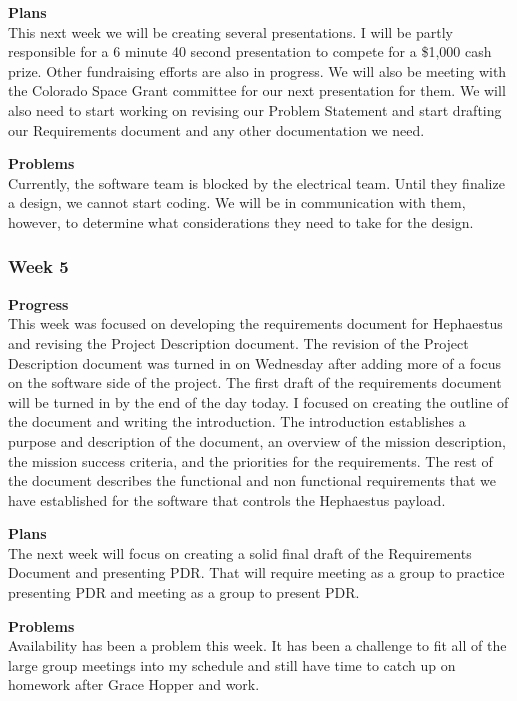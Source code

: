 \textbf{Plans} \\
This next week we will be creating several presentations. I will be partly responsible for a 6 minute 40 second presentation to compete for a \$1,000 cash prize. Other fundraising efforts are also in progress. We will also be meeting with the Colorado Space Grant committee for our next presentation for them. We will also need to start working on revising our Problem Statement and start drafting our Requirements document and any other documentation we need.

\textbf{Problems} \\
Currently, the software team is blocked by the electrical team. Until they finalize a design, we cannot start coding. We will be in communication with them, however, to determine what considerations they need to take for the design.

\subsubsection{Week 5}
\textbf{Progress} \\
This week was focused on developing the requirements document for Hephaestus and revising the Project Description document. The revision of the Project Description document was turned in on Wednesday after adding more of a focus on the software side of the project. The first draft of the requirements document will be turned in by the end of the day today. I focused on creating the outline of the document and writing the introduction. The introduction establishes a purpose and description of the document, an overview of the mission description, the mission success criteria, and the priorities for the requirements. The rest of the document describes the functional and non functional requirements that we have established for the software that controls the Hephaestus payload.

\textbf{Plans} \\
The next week will focus on creating a solid final draft of the Requirements Document and presenting PDR. That will require meeting as a group to practice presenting PDR and meeting as a group to present PDR.

\textbf{Problems} \\
Availability has been a problem this week. It has been a challenge to fit all of the large group meetings into my schedule and still have time to catch up on homework after Grace Hopper and work.

